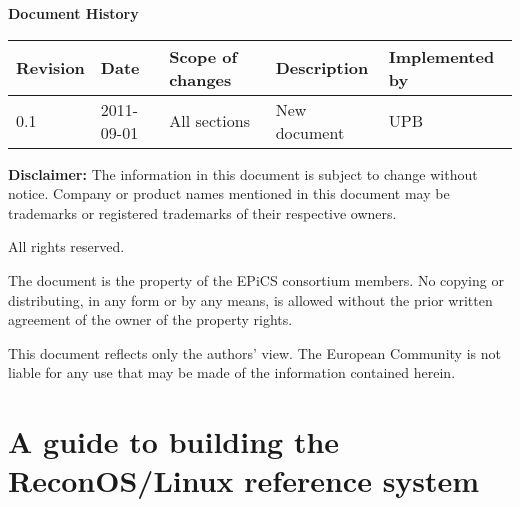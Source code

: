 \documentclass[DIV15,a4paper]{scrartcl}
\begin{document}
\begin{titlepage}
\newpage

\begin{center}

{\large\textbf{Document History}}

\vspace{1ex}

\begin{tabular}{llp{3cm}p{4cm}p{3cm}}
	\toprule
	\textbf{Revision} & \textbf{Date} & \textbf{Scope of changes} & \textbf{Description}       & \textbf{Implemented by} \\
	\midrule
	0.1               & 2011-09-01    & All sections             & New document                & UPB           \\
	
\bottomrule
\end{tabular}

\vspace{1cm}

\end{center}

\vspace{1cm}

\textbf{Disclaimer:} The information in this document is subject to change without notice. Company or product names mentioned in this document may be trademarks or registered trademarks of their respective owners. 

\begin{center}
All rights reserved. 
\end{center}

The document is the property of the EPiCS consortium members. No copying or distributing, in any form or by any means, is allowed without the prior written agreement of the owner of the property rights.

This document reflects only the authors' view. The European Community is not liable for any use that may be made of the information contained herein.

\end{titlepage}

\tableofcontents

\newpage

\section{A guide to building the ReconOS/Linux reference system}
\label{sec:guide_linux}
\end{document}
